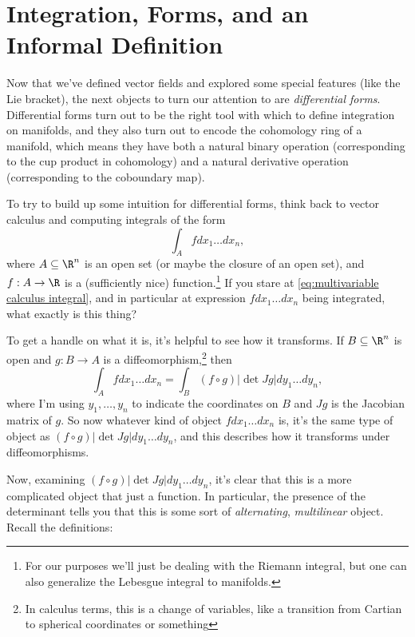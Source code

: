 
\section{Integration, Forms, and an Informal Definition}

Now that we've defined vector fields and explored some special features (like the Lie bracket), the next objects to turn our attention to are \emph{differential forms}. Differential forms turn out to be the right tool with which to define integration on manifolds, and they also turn out to encode the cohomology ring of a manifold, which means they have both a natural binary operation (corresponding to the cup product in cohomology) and a natural derivative operation (corresponding to the coboundary map).

To try to build up some intuition for differential forms, think back to vector calculus and computing integrals of the form
\begin{equation}\label{eq:multivariable calculus integral}
	\int_A f dx_1 \dots dx_n,
\end{equation}
where $A \subseteq \R^n$ is an open set (or maybe the closure of an open set), and $f: A \to \R$ is a (sufficiently nice) function.\footnote{For our purposes we'll just be dealing with the Riemann integral, but one can also generalize the Lebesgue integral to manifolds.} If you stare at \eqref{eq:multivariable calculus integral}, and in particular at expression $f dx_1 \dots dx_n$ being integrated, what exactly is this thing?

To get a handle on what it is, it's helpful to see how it transforms. If $B \subseteq \R^n$ is open and $g: B \to A$ is a diffeomorphism,\footnote{In calculus terms, this is a change of variables, like a transition from Cartian to spherical coordinates or something} then
\[
	\int_A f dx_1 \dots dx_n = \int_B (f \circ g) |\det Jg| dy_1 \dots dy_n,
\]
where I'm using $y_1, \dots , y_n$ to indicate the coordinates on $B$ and $Jg$ is the Jacobian matrix of $g$. So now whatever kind of object $f dx_1 \dots dx_n$ is, it's the same type of object as $(f \circ g) |\det Jg| dy_1 \dots dy_n$, and this describes how it transforms under diffeomorphisms.

Now, examining $(f \circ g) |\det Jg| dy_1 \dots dy_n$, it's clear that this is a more complicated object that just a function. In particular, the presence of the determinant tells you that this is some sort of \emph{alternating}, \emph{multilinear} object. Recall the definitions:


